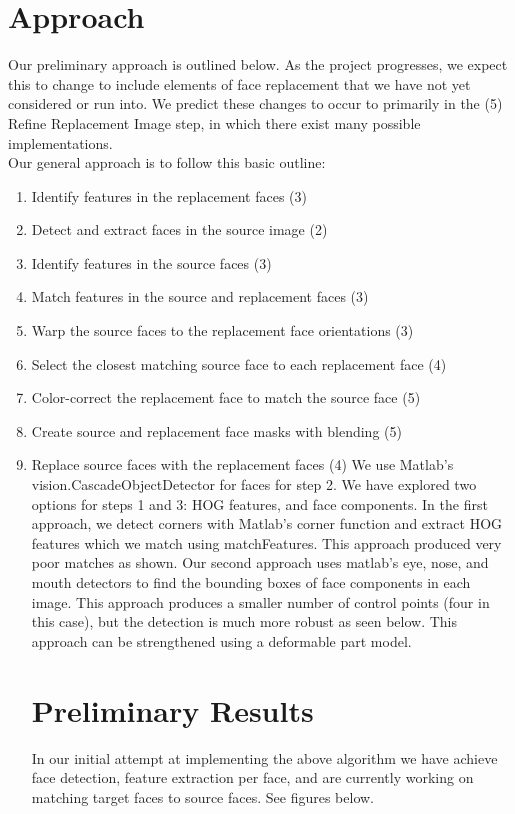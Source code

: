 \documentclass[10pt, twocolumn]{article}
\begin{document}
\section{Approach}
Our preliminary approach is outlined below. As the project progresses, we expect this to change to include elements of face replacement that we have not yet considered or run into. We predict these changes to occur to primarily in the (5) Refine Replacement Image step, in which there exist many possible implementations.\\
Our general approach is to follow this basic outline:
\begin{enumerate}
    \item Identify features in the replacement faces (3)
    \item Detect and extract faces in the source image (2)
    \item Identify features in the source faces (3)
    \item Match features in the source and replacement faces (3)
    \item Warp the source faces to the replacement face orientations (3)
    \item Select the closest matching source face to each replacement face (4)
    \item Color-correct the replacement face to match the source face (5)
    \item Create source and replacement face masks with blending (5)
    \item Replace source faces with the replacement faces (4)
We use Matlab's vision.CascadeObjectDetector for faces for step 2. We have explored two options for steps 1 and 3: HOG features, and face components. In the first approach, we detect corners with Matlab's corner function and extract HOG features which we match using matchFeatures. This approach produced very poor matches as shown. Our second approach uses matlab's eye, nose, and mouth detectors to find the bounding boxes of face components in each image. This approach produces a smaller number of control points (four in this case), but the detection is much more robust as seen below. This approach can be strengthened using a deformable part model.


\section{Preliminary Results} 
In our initial attempt at implementing the above algorithm we have achieve face detection, feature extraction per face, and are currently working on matching target faces to source faces. See figures below.


\end{enumerate}
\end{document}
